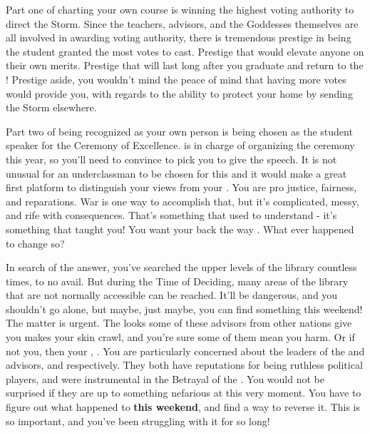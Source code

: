 \documentclass[char]{GL2020}
\begin{document}
Part one of charting your own course is winning the highest voting authority to direct the Storm. Since the teachers, advisors, and the Goddesses themselves are all involved in awarding voting authority, there is tremendous prestige in being the student granted the most votes to cast. Prestige that would elevate anyone on their own merits. Prestige that will last long after you graduate and return to the \pShip{}! Prestige aside, you wouldn't mind the peace of mind that having more votes would provide you, with regards to the ability to protect your home by sending the Storm elsewhere.

Part two of being recognized as your own person is being chosen as the student speaker for the Ceremony of Excellence. \cMusic{\full} is in charge of organizing the ceremony this year, so you'll need to convince \cMusic{\them} to pick you to give the speech. It is not unusual for an underclassman to be chosen for this and it would make a great first platform to distinguish your views from your \cLoud{\parent}. You are pro justice, fairness, and reparations. War is one way to accomplish that, but it's complicated, messy, and rife with consequences. That's something that \cLoud{} used to understand - it's something that \cLoud{\they} taught you! You want your \cLoud{\parent} back the way \cLoud{\they} \cLoud{\were}. What ever happened to change \cLoud{\them} so?

In search of the answer, you've searched the upper levels of the library countless times, to no avail. But during the Time of Deciding, many areas of the library that are not normally accessible can be reached. It'll be dangerous, and you shouldn't go alone, but maybe, just maybe, you can find something this weekend! The matter is urgent. The looks some of these advisors from other nations give you makes your skin crawl, and you're sure some of them mean you harm. Or if not you, then your \cLoud{\parent}, \cLoud{}. You are particularly concerned about the leaders of the \pTech{} and \pFarm{} advisors, \cDiplomat{\full} and \cEvil{\full} respectively. They both have reputations for being ruthless political players, and were instrumental in the Betrayal of the \pShip{}. You would not be surprised if they are up to something nefarious at this very moment. You have to figure out what happened to \cLoud{} \textbf{this weekend}, and find a way to reverse it. This is so important, and you've been struggling with it for so long!
\end{document}
